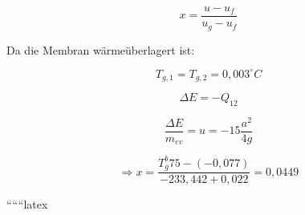 \begin{equation*}
    x = \frac{u - u_f}{u_g - u_f}
\end{equation*}

Da die Membran wärmeüberlagert ist:

\begin{equation*}
    T_{g,1} = T_{g,2} = 0,003^\circ C
\end{equation*}

\begin{equation*}
    \Delta E = -Q_{12}
\end{equation*}

\begin{equation*}
    \frac{\Delta E}{m_{ev}} = u = -15 \frac{a^2}{4g}
\end{equation*}

\begin{equation*}
    \Rightarrow x = \frac{T_{g}^b 75 - (-0,077)}{-233,442 + 0,022} = 0,0449
\end{equation*}

``````latex


